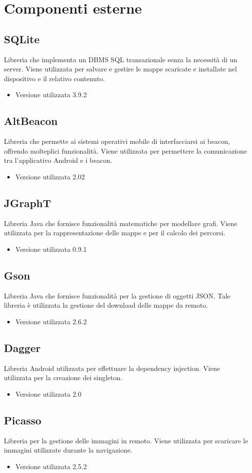 \documentclass[../ManualeSviluppatore.tex]{subfiles}
\begin{document}
\section{Componenti esterne}
	
	\subsection{SQLite}
		Libreria che implementa un DBMS SQL transazionale senza la necessità di un server. Viene utilizzata per salvare e gestire le mappe scaricate e installate nel dispositivo e il relativo contenuto.
		\begin{itemize} \item Versione utilizzata 3.9.2\end{itemize}

	\subsection{AltBeacon}
		Libreria che permette ai sistemi operativi mobile di interfacciarsi ai \gls{beacon}, offrendo molteplici funzionalità. Viene utilizzata per permettere la comunicazione tra l'applicativo \gls{Android} e i \gls{beacon}.
		\begin{itemize} \item Versione utilizzata 2.02\end{itemize}
		
	\subsection{JGraphT}
		Libreria \gls{Java} che fornisce funzionalità matematiche per modellare grafi. Viene utilizzata per la rappresentazione delle mappe e per il calcolo dei percorsi. 
		\begin{itemize} \item Versione utilizzata 0.9.1\end{itemize}

	\subsection{Gson}
		Libreria \gls{Java} che fornisce funzionalità per la gestione di oggetti JSON. Tale libreria è utilizzata la gestione del download delle mappe da remoto. 
		\begin{itemize} \item Versione utilizzata 2.6.2\end{itemize}

	\subsection{Dagger}
		Libreria \gls{Android} utilizzata per effettuare la dependency injection. Viene utilizzata per la creazione dei singleton.
		\begin{itemize} \item Versione utilizzata 2.0\end{itemize}

	\subsection{Picasso}
		Libreria per la gestione delle immagini in remoto. Viene utilizzata per scaricare le immagini utilizzate durante la navigazione.
		\begin{itemize} \item Versione utilizzata 2.5.2\end{itemize}
\end{document}
